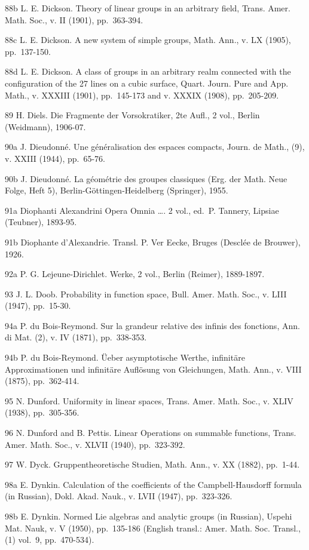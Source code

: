 88b L. E. Dickson. Theory of linear groups in an arbitrary field, Trans. Amer. Math. Soc., v. II (1901), pp.~363-394.

88c L. E. Dickson. A new system of simple groups, Math. Ann., v. LX (1905), pp.~137-150.

88d L. E. Dickson. A class of groups in an arbitrary realm connected with the configuration of the 27 lines on a cubic surface, Quart. Journ. Pure and App. Math., v. XXXIII (1901), pp.~145-173 and v. XXXIX (1908), pp.~205-209.

89 H. Diels. Die Fragmente der Vorsokratiker, 2te Aufl., 2 vol., Berlin (Weidmann), 1906-07.

90a J. Dieudonné. Une généralisation des espaces compacts, Journ. de Math., (9), v. XXIII (1944), pp.~65-76.

90b J. Dieudonné. La géométrie des groupes classiques (Erg. der Math. Neue Folge, Heft 5), Berlin-Göttingen-Heidelberg (Springer), 1955.

91a Diophanti Alexandrini Opera Omnia \ldots. 2 vol., ed.~P. Tannery, Lipsiae (Teubner), 1893-95.

91b Diophante d'Alexandrie. Transl. P. Ver Eecke, Bruges (Desclée de Brouwer), 1926.

92a P. G. Lejeune-Dirichlet. Werke, 2 vol., Berlin (Reimer), 1889-1897.

93 J. L. Doob. Probability in function space, Bull. Amer. Math. Soc., v. LIII (1947), pp.~15-30.

94a P. du Bois-Reymond. Sur la grandeur relative des infinis des fonctions, Ann. di Mat. (2), v. IV (1871), pp.~338-353.

94b P. du Bois-Reymond. Üeber asymptotische Werthe, infinitäre Approximationen und infinitäre Auflösung von Gleichungen, Math. Ann., v. VIII (1875), pp.~362-414.

95 N. Dunford. Uniformity in linear spaces, Trans. Amer. Math. Soc., v. XLIV (1938), pp.~305-356.

96 N. Dunford and B. Pettis. Linear Operations on summable functions, Trans. Amer. Math. Soc., v. XLVII (1940), pp.~323-392.

97 W. Dyck. Gruppentheoretische Studien, Math. Ann., v. XX (1882), pp.~1-44.

98a E. Dynkin. Calculation of the coefficients of the Campbell-Hausdorff formula (in Russian), Dokl. Akad. Nauk., v. LVII (1947), pp.~323-326.

98b E. Dynkin. Normed Lie algebras and analytic groups (in Russian), Uspehi Mat. Nauk, v. V (1950), pp.~135-186 (English transl.: Amer. Math. Soc. Transl., (1) vol.~9, pp.~470-534).

